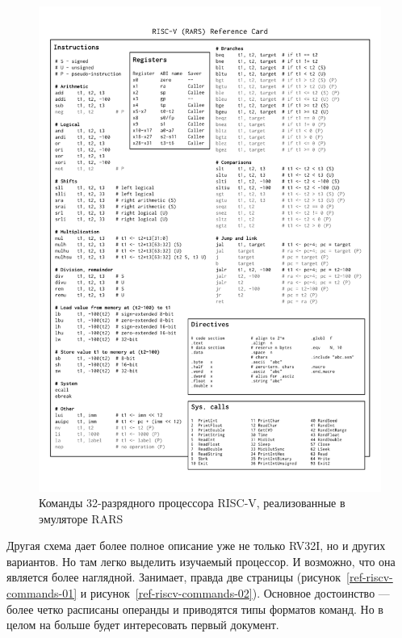 \begin{figure}[htbp]
    \centering
    \includegraphics[width=1.0\textwidth]{img/RARS_reference_card.png}
    \caption{Команды 32-разрядного процессора RISC-V, реализованные в эмуляторе RARS}
    \label{ref-rars-commands}
\end{figure}

Другая схема дает более полное описание уже не только RV32I, но и других вариантов. Но там легко выделить изучаемый процессор. И возможно, что она является более наглядной. Занимает, правда две страницы (рисунок~\ref{ref-riscv-commands-01} и рисунок~\ref{ref-riscv-commands-02}). Основное достоинство --- более четко расписаны операнды и приводятся типы форматов команд. Но в целом на больше будет интересовать первый документ.

